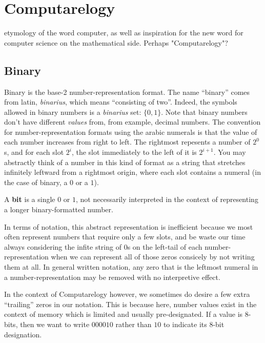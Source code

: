\documentclass{article}
\newcommand{\definition}[1]{
	\vspace{10px}
	\noindent {[\sc Definition]} #1
	\vspace{10px}
}
\begin{document}
\section{Computarelogy}



etymology of the word computer, as well as inspiration for the new word for computer science on the mathematical side. Perhaps "Computarelogy"?


\subsection{Binary}

	Binary is the base-2 number-representation format. The name ``binary'' comes from latin, \textit{binarius}, which means ``consisting of two''. Indeed, the symbols allowed in binary numbers is a \textit{binarius} set: $\{ 0, 1 \}$. Note that binary numbers don't have different \textit{values} from, from example, decimal numbers.  The convention for number-representation formats using the arabic numerals is that the value of each number increases from right to left. The rightmost repesents a number of $2^0$s, and for each slot $2^i$, the slot immediately to the left of it is $2^{i+1}$. You may abstractly think of a number in this kind of format as a string that stretches infinitely leftward from a rightmost origin, where each slot contains a numeral (in the case of binary, a $0$ or a $1$).

	\definition{A \textbf{bit} is a single $0$ or $1$, not necessarily interpreted in the context of representing a longer binary-formatted number.}

	In terms of notation, this abstract representation is inefficient because we most often represent numbers that require only a few slots, and be waste our time always considering the infite string of $0$s on the left-tail of each number-representation when we can represent all of those zeros consicely by not writing them at all. In general written notation, any zero that is the leftmost numeral in a number-representation may be removed with no interpretive effect.

	In the context of Computarelogy however, we sometimes do desire a few extra ``trailing'' zeros in our notation. This is because here, number values exist in the context of memory which is limited and usually pre-designated. If a value is 8-bits, then we want to write $000010$ rather than $10$ to indicate its 8-bit designation.
\end{document}
